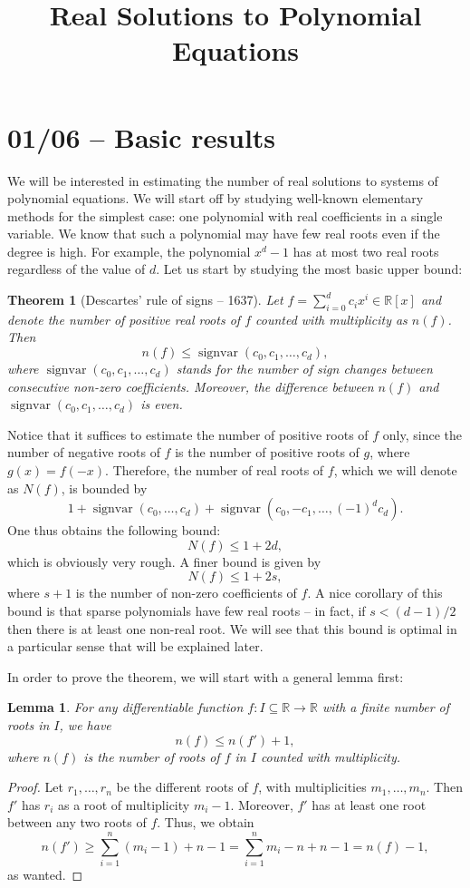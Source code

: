 \documentclass[11pt, a4paper]{article}
\title{Real Solutions to Polynomial Equations}
\date{}
\newcommand{\RR}{\mathbb{R}}
\DeclareMathOperator{\sv}{signvar}
\theoremstyle{plain}
\newtheorem{lemma}[prop]{Lemma}
\newtheorem{thm}[prop]{Theorem}
\theoremstyle{definition}
\begin{document}
\maketitle{}

\section{01/06 -- Basic results}
We will be interested in estimating the number of real solutions to systems of polynomial equations. We will start off by studying well-known elementary methods for the simplest case: one polynomial with real coefficients in a single variable. We know that such a polynomial may have few real roots even if the degree is high. For example, the polynomial $x^d-1$ has at most two real roots regardless of the value of $d$. Let us start by studying the most basic upper bound:

\begin{thm}[Descartes' rule of signs -- 1637] Let $f=\sum_{i=0}^d c_i x^i\in \RR[x]$ and denote the number of positive real roots of $f$ counted with multiplicity as $n(f)$. Then 
\[n(f)\leq \sv(c_0,c_1,\dots,c_d),\]
where $\sv(c_0,c_1,\dots,c_d)$ stands for the number of sign changes between consecutive non-zero coefficients. Moreover, the difference between $n(f)$ and $\sv(c_0,c_1,\dots,c_d)$ is even.
\end{thm}

Notice that it suffices to estimate the number of positive roots of $f$ only, since the number of negative roots of $f$ is the number of positive roots of $g$, where $g(x)=f(-x)$. Therefore, the number of real roots of $f$, which we will denote as $N(f)$, is bounded by
\[1+\sv(c_0,\dots,c_d)+\sv(c_0,-c_1,\dots,(-1)^dc_d).\]
One thus obtains the following bound:
\[N(f)\leq 1+2d,\]
which is obviously very rough. A finer bound is given by
\[N(f)\leq 1+2s,\]
where $s+1$ is the number of non-zero coefficients of $f$. A nice corollary of this bound is that sparse polynomials have few real roots -- in fact, if $s<(d-1)/2$ then there is at least one non-real root. We will see that this bound is optimal in a particular sense that will be explained later.

In order to prove the theorem, we will start with a general lemma first:

\begin{lemma} For any differentiable function $f:I\subseteq \RR\to\RR$ with a finite number of roots in $I$, we have
\[n(f) \leq n(f')+1,\]
where $n(f)$ is the number of roots of $f$ in $I$ counted with multiplicity.
\end{lemma}
\begin{proof} Let $r_1,\dots,r_n$ be the different roots of $f$, with multiplicities $m_1,\dots, m_n$. Then $f'$ has $r_i$ as a root of multiplicity $m_i -1$. Moreover, $f'$ has at least one root between any two roots of $f$. Thus, we obtain
\[n(f')\geq \sum_{i=1}^n (m_i-1)+n-1 = \sum_{i=1}^n m_i-n +n-1 = n(f)-1,\]
as wanted.
\end{proof}
\end{document}
